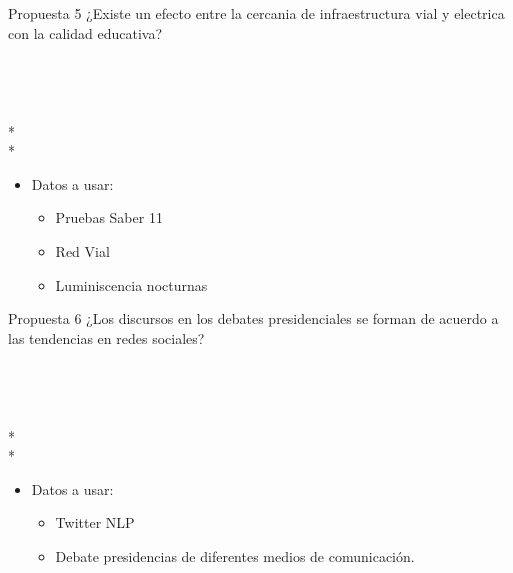 \documentclass[9pt]{beamer}
\begin{document}
\begin{frame}{Propuesta 5}
¿Existe un efecto entre la cercania de infraestructura vial y electrica con la calidad educativa?\\~\\
\\~\\
\\*
\\*
\begin{itemize}
\item []

 Datos a usar:
\begin{itemize}
\item Pruebas Saber 11
\item Red Vial
\item Luminiscencia nocturnas
 
 
\end{itemize}
\end{itemize}

\end{frame}
\begin{frame}{Propuesta 6}
¿Los discursos en los debates presidenciales se forman de acuerdo a las tendencias en redes sociales?\\~\\
\\~\\
\\*
\\*
\begin{itemize}
\item []

 Datos a usar:
\begin{itemize}
\item Twitter NLP 
\item Debate presidencias de diferentes medios de comunicación. 
 
 
\end{itemize}
\end{itemize}

\end{frame}
\end{document}
